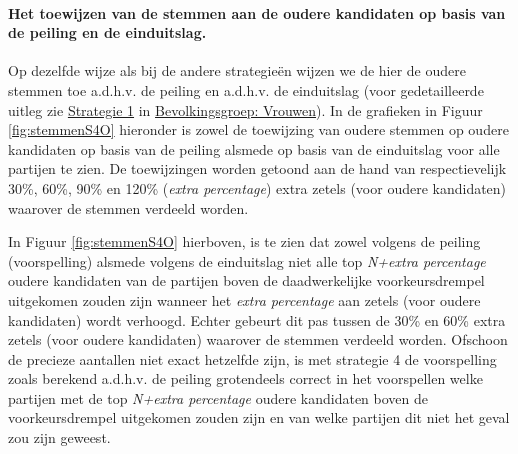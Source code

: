 \paragraph{Het toewijzen van de stemmen aan de oudere kandidaten op basis van de peiling en de einduitslag.}
Op dezelfde wijze als bij de andere strategie\"{e}n wijzen we de hier de oudere stemmen toe a.d.h.v. de peiling en a.d.h.v. de einduitslag (voor gedetailleerde uitleg zie \hyperref[S1V]{Strategie 1} in \hyperref[vrouwen]{Bevolkingsgroep: Vrouwen}). In de grafieken in Figuur \ref{fig:stemmenS4O} hieronder is zowel de toewijzing van oudere stemmen op oudere kandidaten op basis van de peiling alsmede op basis van de einduitslag voor alle partijen te zien. De toewijzingen worden getoond aan de hand van respectievelijk 30\%, 60\%, 90\% en 120\% (\textit{extra percentage}) extra zetels (voor oudere kandidaten) waarover de stemmen verdeeld worden.

In Figuur \ref{fig:stemmenS4O} hierboven, is te zien dat zowel volgens de peiling (voorspelling) alsmede volgens de einduitslag niet alle top \textit{N+extra percentage} oudere kandidaten van de partijen boven de daadwerkelijke voorkeursdrempel uitgekomen zouden zijn wanneer het \textit{extra percentage} aan zetels (voor oudere kandidaten) wordt verhoogd. Echter gebeurt dit pas tussen de 30\%  en 60\% extra zetels (voor oudere kandidaten) waarover de stemmen verdeeld worden. Ofschoon de precieze aantallen niet exact hetzelfde zijn, is met strategie 4 de voorspelling zoals berekend a.d.h.v. de peiling grotendeels correct in het voorspellen welke partijen met de top \textit{N+extra percentage} oudere kandidaten boven de voorkeursdrempel uitgekomen zouden zijn en van welke partijen dit niet het geval zou zijn geweest.
  
